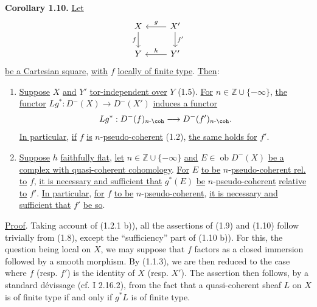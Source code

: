 \textbf{Corollary 1.10.} \uline{Let}
\[
\begin{tikzcd}
X \arrow[d,"f"'] & X' \arrow[l,"g"'] \arrow[d,"f'"]\\
Y & Y' \arrow[l,"h"']
\end{tikzcd}
\]
\uline{be a Cartesian square}, \uline{with} \(f\) \uline{locally of finite type}. \uline{Then}:
\begin{enumerate}[label=\alph*)]
\item \uline{Suppose} \(X\) \uline{and} \(Y'\) \uline{tor-independent over} \(Y\) (1.5). \uline{For} \(n\in\mathbb Z\cup\{-\infty\}\), \uline{the functor} \(Lg^*:D^{-}(X)\to D^{-}(X')\) \uline{induces a functor}
\[
  Lg^*:D^{-}(f)_{n\text{-}\coh}\longrightarrow D^{-}(f')_{n\text{-}\coh}.
\]
\uline{In particular}, \uline{if} \(f\) \uline{is} \(n\)-\uline{pseudo-coherent} (1.2), \uline{the same holds for} \(f'\).

\item \uline{Suppose} \(h\) \uline{faithfully flat}, \uline{let} \(n\in\mathbb Z\cup\{-\infty\}\) \uline{and} \(E\in\operatorname{ob} D^{-}(X)\) \uline{be a complex with quasi-coherent cohomology}. \uline{For} \(E\) \uline{to be} \(n\)-\uline{pseudo-coherent rel.} \uline{to} \(f\), \uline{it is necessary and sufficient that} \(g^*(E)\) \uline{be} \(n\)-\uline{pseudo-coherent} \uline{relative to} \(f'\). \uline{In particular}, \uline{for} \(f\) \uline{to be} \(n\)-\uline{pseudo-coherent}, \uline{it is necessary and sufficient that} \(f'\) \uline{be so}.
\end{enumerate}

\uline{Proof}. Taking account of (1.2.1 b)), all the assertions of (1.9) and (1.10) follow trivially from (1.8), except the ``sufficiency'' part of (1.10 b)). For this, the question being local on \(X\), we may suppose that \(f\) factors as a closed immersion followed by a smooth morphism. By (1.1.3), we are then reduced to the case where \(f\) (resp. \(f'\)) is the identity of \(X\) (resp. \(X'\)). The assertion then follows, by a standard dévissage (cf. I 2.16.2), from the fact that a quasi-coherent sheaf \(L\) on \(X\) is of finite type if and only if \(g^*L\) is of finite type.

